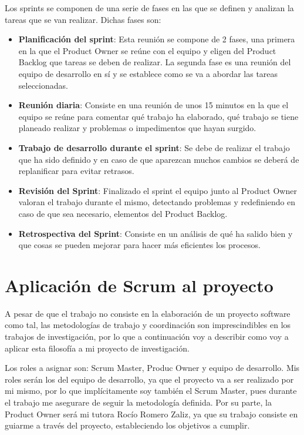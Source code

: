 Los sprints se componen de una serie de fases en las que se definen y analizan la tareas que se van realizar. Dichas fases son:
\begin{itemize}
    \item \textbf{Planificación del sprint}: Esta reunión se compone de 2 fases, una primera en la que el Product Owner se reúne con el equipo y eligen del Product Backlog que tareas se deben de realizar. La segunda fase es una reunión del equipo de desarrollo en sí y se establece como se va a abordar las tareas seleccionadas.
    \item \textbf{Reunión diaria}: Consiste en una reunión de unos 15 minutos en la que el equipo se reúne para comentar qué trabajo ha elaborado, qué trabajo se tiene planeado realizar y problemas o impedimentos que hayan surgido.
    \item \textbf{Trabajo de desarrollo durante el sprint}: Se debe de realizar el trabajo que ha sido definido y en caso de que aparezcan muchos cambios se deberá de replanificar para evitar retrasos.
    \item \textbf{Revisión del Sprint}: Finalizado el sprint el equipo junto al Product Owner valoran el trabajo durante el mismo, detectando problemas y redefiniendo en caso de que sea necesario, elementos del Product Backlog.
    \item \textbf{Retrospectiva del Sprint}: Consiste en un análisis de qué ha salido bien y que cosas se pueden mejorar para hacer más eficientes los procesos.
\end{itemize}

\section{Aplicación de Scrum al proyecto}

A pesar de que el trabajo no consiste en la elaboración de un proyecto software como tal, las metodologías de trabajo y coordinación son imprescindibles en los trabajos de investigación, por lo que a continuación voy a describir como voy a aplicar esta filosofía a mi proyecto de investigación.

Los roles a asignar son: Scrum Master, Produc Owner y equipo de desarrollo. Mis roles serán los del equipo de desarrollo, ya que el proyecto va a ser realizado por mi mismo, por lo que implícitamente soy también el Scrum Master, pues durante el trabajo me asegurare de seguir la metodología definida. Por su parte, la Product Owner será mi tutora Rocío Romero Zaliz, ya que su trabajo consiste en guiarme a través del proyecto, estableciendo los objetivos a cumplir.

